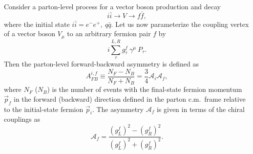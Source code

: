 \documentclass[prd,aps,floats,preprintnumbers,preprint,superscriptaddress,floatfix,nofootinbib]{revtex4}
\def\be{\begin{equation}}
\def\ee{\end{equation}}
\begin{document}
Consider a parton-level process for a vector boson production and decay
\be
i\bar i \to V \to f \bar f,
\ee
where the initial state $i\bar i=e^-e^+,\ q\bar q$. 
Let us now parameterize the coupling vertex of a vector boson $V_\mu$ to 
an arbitrary  fermion pair $f$ by
\be
i \sum_\tau^{L,R} g_\tau^f \ \gamma^\mu\ P_\tau.
\ee
Then the parton-level forward-backward asymmetry is defined as
\be
A^{i,f}_{FB} \equiv  \frac{N_F - N_B}{N_F + N_B}
	= \frac{3}{4} \mathcal{A}_i \mathcal{A}_f,
\ee
where $N_F$ ($N_B$) is the number of events with the final-state fermion
momentum  $\vec p_f$ 
in the forward (backward) direction defined in the parton c.m.~frame
relative to the initial-state fermion  $\vec p_i$.  
The asymmetry $\mathcal{A}_f$ is given in 
terms of the chiral couplings as
\begin{equation}
	\mathcal{A}_f = \frac{(g_L^f)^2 - (g_R^f)^2}{(g_L^f)^2 + (g_R^f)^2}.
\end{equation}
\end{document}
